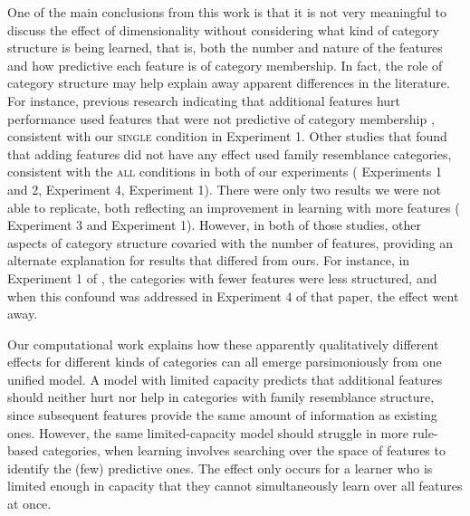 \documentclass[a4paper, doc, floatsintext]{apa6}
\begin{document}
One of the main conclusions from this work is that it is not very meaningful to discuss the effect of dimensionality without considering what kind of category structure is being learned, that is, both the number and nature of the features and how predictive each feature is of category membership. In fact, the role of category structure may help explain away apparent differences in the literature. For instance, previous research indicating that additional features hurt performance used features that were not predictive of category membership \cite{bourne1959mathematical, edgell1996irrelevant}, consistent with our \textsc{single} condition in Experiment 1. Other studies that found that adding features did not have any effect used family resemblance categories, consistent with the \textsc{all} conditions in both of our experiments  ( Experiments 1 and 2,  Experiment 4,  Experiment 1). There were only two results we were not able to replicate, both reflecting an improvement in learning with more features ( Experiment 3 and  Experiment 1). However, in both of those studies, other aspects of category structure covaried with the number of features, providing an alternate explanation for results that differed from ours. For instance, in Experiment 1 of , the categories with fewer features were less structured, and when this confound was addressed in Experiment 4 of that paper, the effect went away.

Our computational work explains how these apparently qualitatively different effects for different kinds of categories can all emerge parsimoniously from one unified model. A model with limited capacity predicts that additional features should neither hurt nor help in categories with family resemblance structure, since subsequent features provide the same amount of information as existing ones. However, the same limited-capacity model should struggle in more rule-based categories, when learning involves searching over the space of features to identify the (few) predictive ones. The effect only occurs for a learner who is limited enough in capacity that they cannot simultaneously learn over all features at once.
\end{document}
